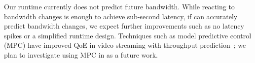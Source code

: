  Our runtime currently does not predict
future bandwidth. While reacting to bandwidth changes is enough to achieve
sub-second latency, if \sysname{} can accurately predict bandwidth changes, we
expect further improvements such as no latency spikes or a simplified runtime
design. Techniques such as model predictive control (MPC) have improved QoE in
video streaming with throughput prediction~\cite{yin2015control}; we plan to
investigate using MPC in \sysname{} as a future work.

